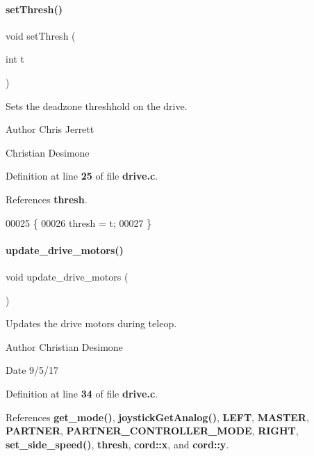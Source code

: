 \paragraph{set\+Thresh()}
{\footnotesize\ttfamily void set\+Thresh (\begin{DoxyParamCaption}\item[{int}]{t }\end{DoxyParamCaption})}



Sets the deadzone threshhold on the drive. 

\begin{DoxyAuthor}{Author}
Chris Jerrett

Christian Desimone 
\end{DoxyAuthor}


Definition at line \textbf{ 25} of file \textbf{ drive.\+c}.



References \textbf{ thresh}.


\begin{DoxyCode}
00025                      \{
00026   thresh = t;
00027 \}
\end{DoxyCode}
\mbox{\label{drive_8h_a8224a4626a934d30ed587671b7004bf8}} 
\paragraph{update\+\_\+drive\+\_\+motors()}
{\footnotesize\ttfamily void update\+\_\+drive\+\_\+motors (\begin{DoxyParamCaption}{ }\end{DoxyParamCaption})}



Updates the drive motors during teleop. 

\begin{DoxyAuthor}{Author}
Christian Desimone 
\end{DoxyAuthor}
\begin{DoxyDate}{Date}
9/5/17 
\end{DoxyDate}


Definition at line \textbf{ 34} of file \textbf{ drive.\+c}.



References \textbf{ get\+\_\+mode()}, \textbf{ joystick\+Get\+Analog()}, \textbf{ L\+E\+FT}, \textbf{ M\+A\+S\+T\+ER}, \textbf{ P\+A\+R\+T\+N\+ER}, \textbf{ P\+A\+R\+T\+N\+E\+R\+\_\+\+C\+O\+N\+T\+R\+O\+L\+L\+E\+R\+\_\+\+M\+O\+DE}, \textbf{ R\+I\+G\+HT}, \textbf{ set\+\_\+side\+\_\+speed()}, \textbf{ thresh}, \textbf{ cord\+::x}, and \textbf{ cord\+::y}.



